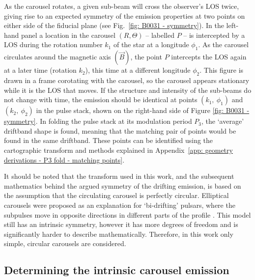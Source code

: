 As the carousel rotates, a given sub-beam will cross the observer's LOS twice, giving rise to an expected symmetry of the emission properties at two points on either side of the fiducial plane (see Fig.~\ref{fig: B0031 - symmetry}). In the left-hand panel a location in the carousel $(R, \Theta)$ -- labelled $P$ -- is intercepted by a LOS during the rotation number $k_1$ of the star at a longitude $\phi_1$. As the carousel circulates around the magnetic axis $(\vec{B})$, the point $P$ intercepts the LOS again at a later time (rotation $k_2$), this time at a different longitude $\phi_2$. This figure is drawn in a frame corotating with the carousel, so the carousel appears stationary while it is the LOS that moves. If the structure and intensity of the sub-beams do not change with time, the emission should be identical at points $(k_1,\ \phi_1)$ and $(k_2,\ \phi_2)$ in the pulse stack, shown on the right-hand side of Figure \ref{fig: B0031 - symmetry}. In folding the pulse stack at its modulation period $P_3$, the `average' driftband shape is found, meaning that the matching pair of points would be found in the same driftband. These points can be identified using the cartographic transform and methods explained in Appendix~\ref{app: geometry derivations - P3 fold - matching points}.

It should be noted that the transform used in this work, and the subsequent mathematics behind the argued symmetry of the drifting emission, is based on the assumption that the circulating carousel is perfectly circular. Elliptical carousels were proposed as an explanation for `bi-drifting' pulsars, where the subpulses move in opposite directions in different parts of the profile \citep{QLZ+2004, Wxxx2016, WWxx2017, SLWM2020}. This model still has an intrinsic symmetry, however it has more degrees of freedom and is significantly harder to describe mathematically. Therefore, in this work only simple, circular carousels are considered.











\subsection{Determining the intrinsic carousel emission}
\label{sec: B0031 - methods - calculating intrinsic emission}

